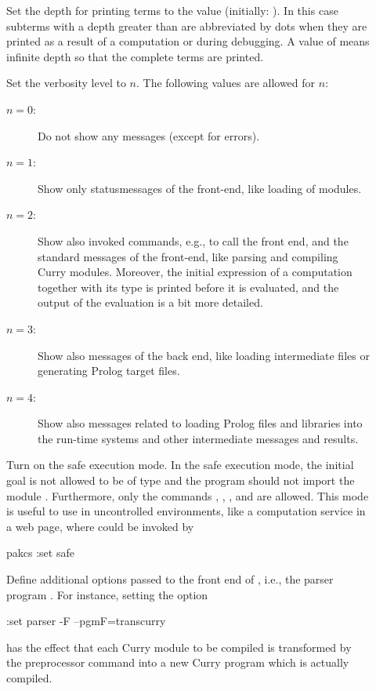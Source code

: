 \begin{description}
\item[]
Set the depth for printing terms to the value  (initially: ).
In this case subterms with a depth greater than  are abbreviated
by dots when they are printed as a result of a computation
or during debugging. A value of  means infinite depth
so that the complete terms are printed.

\item[]
Set the verbosity level to $n$. The following values are allowed
for $n$:
\begin{description}
\item[$n=0$:] Do not show any messages (except for errors).
\item[$n=1$:] Show only statusmessages of the front-end, like loading
of modules.
\item[$n=2$:]
Show also invoked commands, e.g., to call the front end,
and the standard messages of the front-end, like parsing and
compiling Curry modules.
Moreover, the initial expression of a computation together
with its type is printed before it is evaluated,
and the output of the evaluation is a bit more detailed.
\item[$n=3$:]
Show also messages of the back end, like loading intermediate files
or generating Prolog target files.
\item[$n=4$:]
Show also messages related to loading Prolog files and libraries
into the run-time systems and other intermediate messages and results.
\end{description}

\item[]%
Turn on the safe execution mode.
In the safe execution mode, the initial goal is
not allowed to be of type  and the program should not
import the module .
Furthermore, only the commands
, , , and  are allowed.
This mode is useful to use \CYS in uncontrolled environments,
like a computation service in a web page, where \CYS could
be invoked by
\begin{curry}
pakcs :set safe
\end{curry}

\item[]
Define additional options passed to the front end of \CYS, i.e.,
the parser program .
For instance, setting the option
\begin{curry}
:set parser -F --pgmF=transcurry
\end{curry}
has the effect that each Curry module to be compiled is
transformed by the preprocessor command 
into a new Curry program which is actually compiled.


\end{description}
